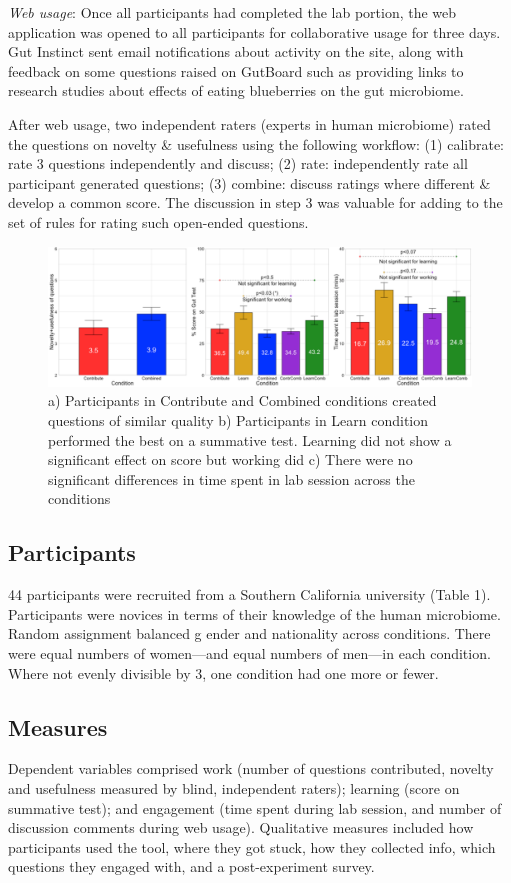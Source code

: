\textit{Web usage}: Once all participants had completed the lab portion, the web application was opened to all participants for collaborative usage for three days. Gut Instinct sent email notifications about activity on the site, along with feedback on some questions raised on GutBoard such as providing links to research studies about effects of eating blueberries on the gut microbiome. 

After web usage, two independent raters (experts in human microbiome) rated the questions on novelty \& usefulness using the following workflow: (1) calibrate: rate 3 questions independently and discuss; (2) rate: independently rate all participant generated questions; (3) combine: discuss ratings where different \& develop a common score. The discussion in step 3 was valuable for adding to the set of rules for rating such open-ended questions. 

\begin{figure}[h] 
  \centering
  \includegraphics[width=1.0\textwidth]{figures/gutinstinct/gi-7.png}
  \caption[]
{a) Participants in Contribute and Combined conditions created questions of similar quality b) Participants in Learn condition performed the best on a summative test. Learning did not show a significant effect on score but working did c) There were no significant differences in time spent in lab session across the conditions }
  \label{fig:gi-7}
\end{figure}

\subsection{Participants}
44 participants were recruited from a Southern California university (Table 1). Participants were novices in terms of their knowledge of the human microbiome. Random assignment balanced g  ender and nationality across conditions. There were equal numbers of women—and equal numbers of men—in each condition. Where not evenly divisible by 3, one condition had one more or fewer. 

\subsection{Measures}
Dependent variables comprised work (number of questions contributed, novelty and usefulness measured by blind, independent raters); learning (score on summative test); and engagement (time spent during lab session, and number of discussion comments during web usage). Qualitative measures included how participants used the tool, where they got stuck, how they collected info, which questions they engaged with, and a post-experiment survey.

